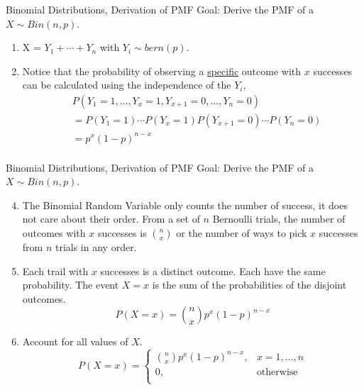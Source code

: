 \documentclass[handout]{beamer}
\begin{document}
    \begin{frame}{Binomial Distributions, Derivation of PMF}
        Goal: Derive the PMF of a $X\sim Bin(n,p)$.
        \begin{enumerate}
            \item X = $Y_1 + \cdots + Y_n$ with $Y_i \sim bern(p)$.
            \item Notice that the probability of observing a \underline{specific} outcome with $x$ successes can be calculated using the independence of the $Y_i$,
            \begin{align*}
            & P(Y_1=1, \ldots, Y_x=1, Y_{x+1} =0, \ldots, Y_n =0) \\
            &=  P(Y_1=1)\cdots P(Y_x=1) P(Y_{x+1}=0) \cdots P(Y_n=0)\\
            &= p^x (1-p)^{n-x}\\
            \end{align*}
        \end{enumerate}
    \end{frame}
    \begin{frame}{Binomial Distributions, Derivation of PMF}
        Goal: Derive the PMF of a $X\sim Bin(n,p)$.
        \begin{enumerate}
            \setcounter{enumi}{3}
            \item The Binomial Random Variable only counts the number of success, it does not care about their order. From a set of $n$ Bernoulli trials, the number of outcomes with $x$ successes is $\binom{n}{x}$ or the number of ways to pick $x$ successes from $n$ trials in any order.
            \item Each trail with $x$ successes is a distinct outcome. Each have the same probability. The event $X=x$ is the sum of the probabilities of the disjoint outcomes.
            $$P(X=x) = \binom{n}{x} p^x (1-p)^{n-x}$$
            \item Account for all values of $X$.
            $$P(X=x) = 
            \left\{\begin{array}{lr}
                \binom{n}{x} p^x (1-p)^{n-x}, &  x = 1, \ldots, n\\
                0, & \text{otherwise}\\
                \end{array}\right.
            $$
        \end{enumerate}
    \end{frame}
\end{document}

